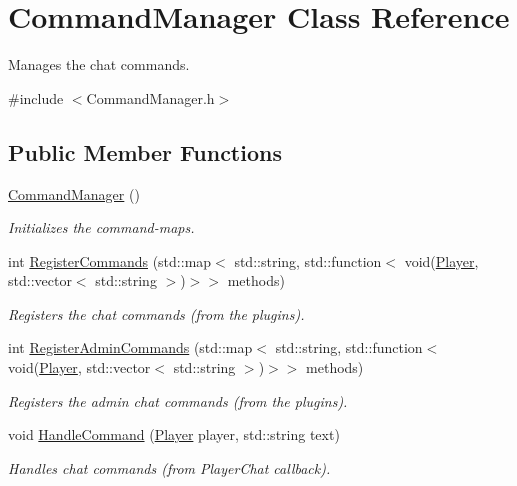 \hypertarget{classCommandManager}{\section{Command\-Manager Class Reference}
\label{classCommandManager}
}


Manages the chat commands.  




{\ttfamily \#include $<$Command\-Manager.\-h$>$}

\subsection*{Public Member Functions}
\begin{DoxyCompactItemize}
\item 
\hypertarget{classCommandManager_a8a13226bf933396a3f35dfb5bee3e813}{\hyperlink{classCommandManager_a8a13226bf933396a3f35dfb5bee3e813}{Command\-Manager} ()}\label{classCommandManager_a8a13226bf933396a3f35dfb5bee3e813}

\begin{DoxyCompactList}\small\item\em Initializes the command-\/maps. \end{DoxyCompactList}\item 
int \hyperlink{classCommandManager_a777c8b1861f5439013c9b8583cf2c0dc}{Register\-Commands} (std\-::map$<$ std\-::string, std\-::function$<$ void(\hyperlink{structPlayer}{Player}, std\-::vector$<$ std\-::string $>$)$>$$>$ methods)
\begin{DoxyCompactList}\small\item\em Registers the chat commands (from the plugins). \end{DoxyCompactList}\item 
int \hyperlink{classCommandManager_af21873775c4c38a9257e27b28c0f0054}{Register\-Admin\-Commands} (std\-::map$<$ std\-::string, std\-::function$<$ void(\hyperlink{structPlayer}{Player}, std\-::vector$<$ std\-::string $>$)$>$$>$ methods)
\begin{DoxyCompactList}\small\item\em Registers the admin chat commands (from the plugins). \end{DoxyCompactList}\item 
void \hyperlink{classCommandManager_a42082bb9a76c725e58aa9c327dd41080}{Handle\-Command} (\hyperlink{structPlayer}{Player} player, std\-::string text)
\begin{DoxyCompactList}\small\item\em Handles chat commands (from Player\-Chat callback). \end{DoxyCompactList}\end{DoxyCompactItemize}
